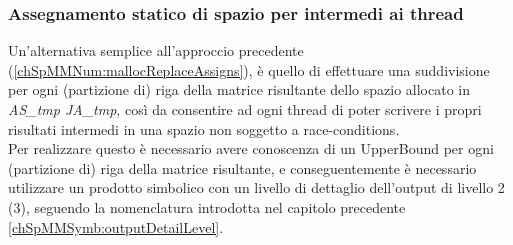 \subsubsection{Assegnamento statico  di spazio per \nnz intermedi ai thread} \label{chSpMMNum:preSplitAS_JA_tmp}
Un'alternativa semplice all'approccio precedente (\ref{chSpMMNum:mallocReplaceAssigns}),
è quello di effettuare una suddivisione per ogni (partizione di) riga della matrice risultante
dello spazio allocato in \emph{AS\_tmp JA\_tmp}, così da consentire ad ogni thread 
di poter scrivere i propri risultati intermedi in una spazio non soggetto a race-conditions.\\
Per realizzare questo è necessario avere conoscenza di un UpperBound per ogni (partizione di)
riga della matrice risultante, e conseguentemente è necessario utilizzare un prodotto simbolico
con un livello di dettaglio dell'output di livello 2 (3), 
seguendo la nomenclatura introdotta nel capitolo precedente \ref{chSpMMSymb:outputDetailLevel}.\\

